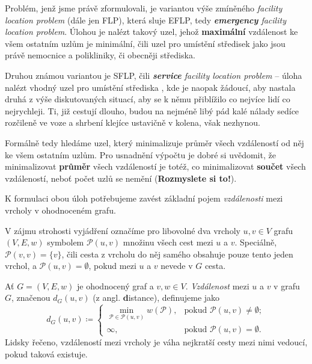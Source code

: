 Problém, jenž jsme právě zformulovali, je variantou výše zmíněného
\emph{facility location problem} (dále jen FLP), která sluje EFLP, tedy
\emph{\textbf{emergency} facility location problem}. Úlohou je nalézt takový
uzel, jehož \textbf{maximální} vzdálenost ke všem ostatním uzlům je minimální,
čili uzel pro umístění středisek jako jsou právě nemocnice a polikliniky, či
obecněji  střediska.

Druhou známou variantou je SFLP, čili \emph{\textbf{service} facility location
problem} -- úloha nalézt vhodný uzel pro umístění střediska , kde je
naopak žádoucí, aby nastala druhá z výše diskutovaných situací, aby se k němu
přiblížilo co nejvíce lidí co nejrychleji. Ti, již cestují dlouho, budou na
nejméně libý pád kalé nálady sedíce rozčileně ve voze a shrbení klejíce
ustavičně v kolena, však nezhynou.

Formálně tedy hledáme uzel, který minimalizuje průměr všech vzdáleností od něj
ke všem ostatním uzlům. Pro usnadnění výpočtu je dobré si uvědomit, že
minimalizovat \textbf{průměr} všech vzdáleností je totéž, co minimalizovat
\textbf{součet} všech vzdáleností, neboť počet uzlů se nemění
(\textbf{Rozmys\-lete si to!}).

K formulaci obou úloh potřebujeme zavést základní pojem \emph{vzdálenosti}
me\-zi vrcholy v ohodnoceném grafu.


V zájmu strohosti vyjádření označíme pro libovolné dva vrcholy $u,v \in V$
grafu $(V,E,w)$ symbolem $\mathcal{P}(u,v)$ množinu všech cest mezi $u$ a $v$.
Speciálně, $\mathcal{P}(v,v) = \{v\}$, čili cesta z vrcholu do něj samého
obsahuje pouze tento jeden vrchol, a $\mathcal{P}(u,v) = \emptyset$, pokud mezi
$u$ a $v$ nevede v $G$ cesta.

\begin{definition}
\label{def:vzdalenost-v-grafu}
 Ať $G = (V,E,w)$ je ohodnocený graf a $v,w \in V$. \emph{Vzdálenost} mezi $u$
 a $v$ v grafu $G$, značenou $d_G(u,v)$ (z angl. \textbf{d}istance), definujeme
 jako
 \[
  d_G(u,v) \coloneqq 
  \begin{cases}
   \min_{\mathcal{P} \in \mathcal{P}(u,v)} w(\mathcal{P}),& \text{pokud }
   \mathcal{P}(u,v) \neq \emptyset;\\
   \infty, &\text{pokud } \mathcal{P}(u,v) = \emptyset.
  \end{cases}
 \]
 Lidsky řečeno, vzdáleností mezi vrcholy je váha nejkratší cesty mezi nimi
 vedoucí, pokud taková existuje.
\end{definition}

